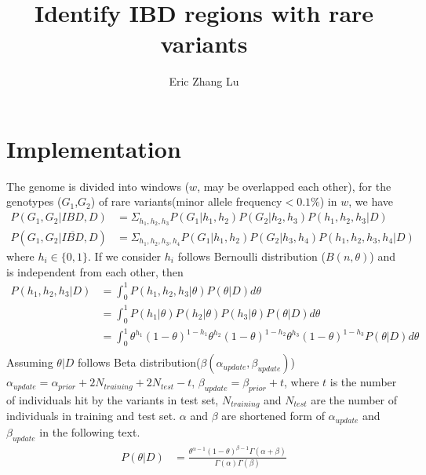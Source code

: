 \documentclass{article}
\begin{document}
  \author{Eric Zhang Lu}
  \title{Identify IBD regions with rare variants}
\newcommand{\keywords}[1]{\par\addvspace\baselineskip
\noindent\keywordname\enspace\ignorespaces#1}
  \maketitle
\section{Implementation}
The genome is divided into windows ($w$, may be overlapped each other), for the genotypes ($G_1$,$G_2$) of rare variants(minor allele frequency$<0.1\%$) in $w$, we have
\begin{equation}
\begin{split}
P(G_1,G_2|IBD,D)&=\Sigma_{h_1,h_2,h_3}P(G_1|h_1,h_2)P(G_2|h_2,h_3)P(h_1,h_2,h_3|D)\\
P(G_1,G_2|\overline{IBD},D)&=\Sigma_{h_1,h_2,h_3,h_4}P(G_1|h_1,h_2)P(G_2|h_3,h_4)P(h_1,h_2,h_3,h_4|D)
\end{split}
\end{equation}
where $h_i \in \{0,1\}$.
If we consider $h_i$ follows Bernoulli distribution ($B(n,\theta)$) and is independent from each other, then
\begin{equation}
\begin{split}
P(h_1,h_2,h_3|D)&=\int_0^1P(h_1,h_2,h_3|\theta)P(\theta|D)d\theta\\
&=\int_0^1P(h_1|\theta)P(h_2|\theta)P(h_3|\theta)P(\theta|D)d\theta\\
&=\int_0^1\theta^{h_1}(1-\theta)^{1-h_1}\theta^{h_2}(1-\theta)^{1-h_2}\theta^{h_3}(1-\theta)^{1-h_3}P(\theta|D)d\theta\\
\end{split}
\end{equation}
Assuming $\theta|D$ follows Beta distribution($\beta(\alpha_{update}, \beta_{update})$)
$\alpha_{update}=\alpha_{prior}+2N_{training}+2N_{test}-t$, $\beta_{update}=\beta_{prior}+t$, where $t$ is the number of individuals hit by the variants in test set, $N_{training}$ and $N_{test}$ are the number of individuals in training and test set. $\alpha$ and $\beta$ are shortened form of $\alpha_{update}$ and $\beta_{update}$ in the following text.
\begin{equation}
\begin{split}
P(\theta|D)&=\frac{\theta^{\alpha-1}(1-\theta)^{\beta-1}\Gamma(\alpha+\beta)}{\Gamma(\alpha)\Gamma(\beta)}
\end{split}
\end{equation}
\end{document}
